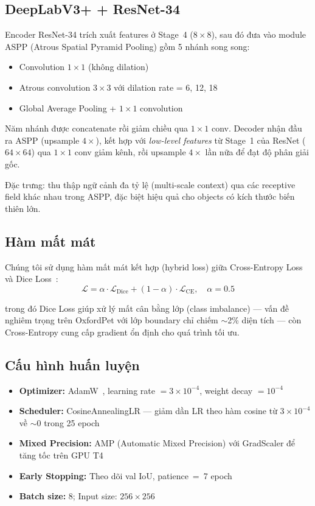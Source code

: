 \documentclass{article}
\begin{document}
\subsection{DeepLabV3+ + ResNet-34}
\label{subsec:deeplabv3}

Encoder ResNet-34 trích xuất features ở Stage~4 ($8{\times}8$), sau đó đưa vào module ASPP (Atrous Spatial Pyramid Pooling) gồm 5 nhánh song song:
\begin{itemize}
    \item Convolution $1{\times}1$ (không dilation)
    \item Atrous convolution $3{\times}3$ với dilation rate = 6, 12, 18
    \item Global Average Pooling + $1{\times}1$ convolution
\end{itemize}
Năm nhánh được concatenate rồi giảm chiều qua $1{\times}1$ conv.
Decoder nhận đầu ra ASPP (upsample $4\times$), kết hợp với \emph{low-level features} từ Stage~1 của ResNet ($64{\times}64$) qua $1{\times}1$ conv giảm kênh, rồi upsample $4\times$ lần nữa để đạt độ phân giải gốc.

Đặc trưng: thu thập ngữ cảnh đa tỷ lệ (multi-scale context) qua các receptive field khác nhau trong ASPP, đặc biệt hiệu quả cho objects có kích thước biến thiên lớn.

\subsection{Hàm mất mát}
\label{subsec:loss}

Chúng tôi sử dụng hàm mất mát kết hợp (hybrid loss) giữa Cross-Entropy Loss và Dice Loss~\cite{milletari2016vnet}:
\begin{equation}
\mathcal{L} = \alpha \cdot \mathcal{L}_{\text{Dice}} + (1 - \alpha) \cdot \mathcal{L}_{\text{CE}}, \quad \alpha = 0.5
\label{eq:loss}
\end{equation}

trong đó Dice Loss giúp xử lý mất cân bằng lớp (class imbalance) --- vấn đề nghiêm trọng trên OxfordPet với lớp boundary chỉ chiếm $\sim$2\% diện tích --- còn Cross-Entropy cung cấp gradient ổn định cho quá trình tối ưu.

\subsection{Cấu hình huấn luyện}
\label{subsec:training}

\begin{itemize}
    \item \textbf{Optimizer:} AdamW~\cite{loshchilov2017adamw}, learning rate $= 3{\times}10^{-4}$, weight decay $= 10^{-4}$
    \item \textbf{Scheduler:} CosineAnnealingLR --- giảm dần LR theo hàm cosine từ $3{\times}10^{-4}$ về $\sim$0 trong 25 epoch
    \item \textbf{Mixed Precision:} AMP (Automatic Mixed Precision) với GradScaler để tăng tốc trên GPU T4
    \item \textbf{Early Stopping:} Theo dõi val IoU, patience~=~7 epoch
    \item \textbf{Batch size:} 8; Input size: $256{\times}256$
\end{itemize}
\end{document}
